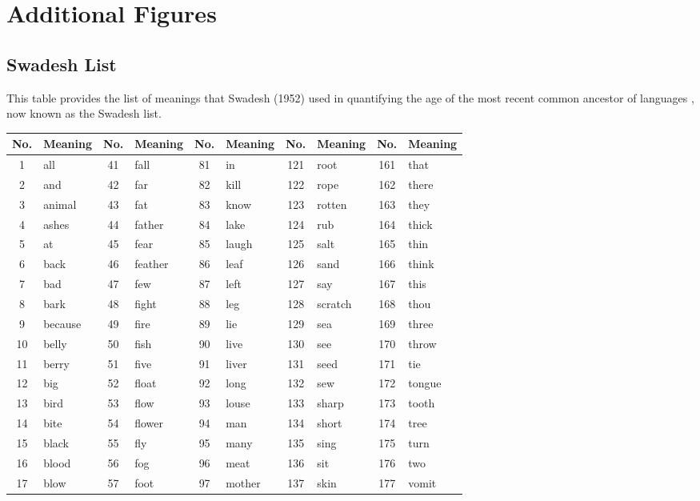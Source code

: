 \chapter{Additional Figures}

\section{Swadesh List}
This table provides the list of meanings that Swadesh (1952) used in quantifying the age of the most recent common ancestor of languages \cite{Swadesh1952}, now known as the Swadesh list.

\begin{table}[ht]
\centering
\scriptsize
\begin{tabular}{cl|cl|cl|cl|cl}
\toprule
No. & Meaning & No. & Meaning & No. & Meaning & No. & Meaning & No. & Meaning \\
\midrule
1 & all & 41 & fall & 81 & in & 121 & root & 161 & that \\
2 & and & 42 & far & 82 & kill & 122 & rope & 162 & there \\
3 & animal & 43 & fat & 83 & know & 123 & rotten & 163 & they \\
4 & ashes & 44 & father & 84 & lake & 124 & rub & 164 & thick \\
5 & at & 45 & fear & 85 & laugh & 125 & salt & 165 & thin \\
6 & back & 46 & feather & 86 & leaf & 126 & sand & 166 & think \\
7 & bad & 47 & few & 87 & left & 127 & say & 167 & this \\
8 & bark & 48 & fight & 88 & leg & 128 & scratch & 168 & thou \\
9 & because & 49 & fire & 89 & lie & 129 & sea & 169 & three \\
10 & belly & 50 & fish & 90 & live & 130 & see & 170 & throw \\
11 & berry & 51 & five & 91 & liver & 131 & seed & 171 & tie \\
12 & big & 52 & float & 92 & long & 132 & sew & 172 & tongue \\
13 & bird & 53 & flow & 93 & louse & 133 & sharp & 173 & tooth \\
14 & bite & 54 & flower & 94 & man & 134 & short & 174 & tree \\
15 & black & 55 & fly & 95 & many & 135 & sing & 175 & turn \\
16 & blood & 56 & fog & 96 & meat & 136 & sit & 176 & two \\
17 & blow & 57 & foot & 97 & mother & 137 & skin & 177 & vomit \\

\end{tabular}
\end{table}
